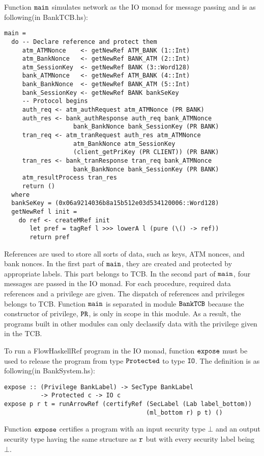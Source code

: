 \documentclass{report}
\newcommand{\co}[1]{$\cod{#1}$}
\begin{document}
Function \co{main} simulates network as the IO monad for message passing and is as following(in BankTCB.hs):
\begin{Verbatim}[fontsize=\small]
main =
  do -- Declare reference and protect them
     atm_ATMNonce    <- getNewRef ATM_BANK (1::Int)
     atm_BankNonce   <- getNewRef BANK_ATM (2::Int)
     atm_SessionKey  <- getNewRef BANK (3::Word128)
     bank_ATMNonce   <- getNewRef ATM_BANK (4::Int)
     bank_BankNonce  <- getNewRef BANK_ATM (5::Int)
     bank_SessionKey <- getNewRef BANK bankSeKey     
     -- Protocol begins
     auth_req <- atm_authRequest atm_ATMNonce (PR BANK)
     auth_res <- bank_authResponse auth_req bank_ATMNonce 
                   bank_BankNonce bank_SessionKey (PR BANK)
     tran_req <- atm_tranRequest auth_res atm_ATMNonce 
                   atm_BankNonce atm_SessionKey
                   (client_getPriKey (PR CLIENT)) (PR BANK)
     tran_res <- bank_tranResponse tran_req bank_ATMNonce 
                   bank_BankNonce bank_SessionKey (PR BANK)
     atm_resultProcess tran_res
     return ()
  where
  bankSeKey = (0x06a9214036b8a15b512e03d534120006::Word128)
  getNewRef l init =
    do ref <- createMRef init
       let pref = tagRef l >>> lowerA l (pure (\() -> ref))
       return pref
\end{Verbatim}
References are used to store all sorts of data, such as keys, ATM nonces, and bank nonces. In the first
part of \co{main}, they are created and protected by appropriate labels. This part belongs to TCB.
In the second part of \co{main},
four messages are passed in the IO monad. For each procedure, required data references and a privilege are given.
The dispatch of references and privileges belongs to TCB. Function \co{main} is separated in module \co{BankTCB}
because the constructor of privilege, \co{PR}, is only in scope in this module. 
As a result, the programs built in other modules can only declassify data with the privilege
given in the TCB.

To run a FlowHaskellRef program in the IO monad, function \co{expose} must be used to release the program from
type \co{Protected} to type \co{IO}.
The definition is as following(in BankSystem.hs):
\begin{Verbatim}[fontsize=\small]
expose :: (Privilege BankLabel) -> SecType BankLabel 
          -> Protected c -> IO c
expose p r t = runArrowRef (certifyRef (SecLabel (Lab label_bottom)) 
                                       (ml_bottom r) p t) ()
\end{Verbatim}
Function \co{expose} certifies a program with an input security type $\bot$ and an output security
type having the same structure as \co{r} but with every security label being $\bot$.
\end{document}
